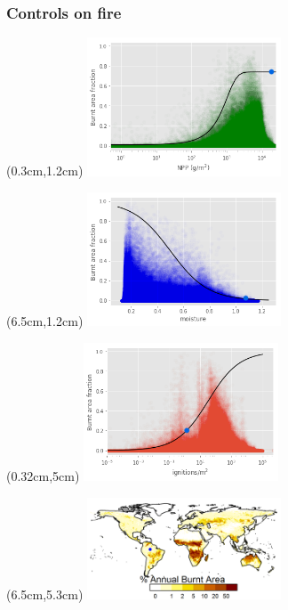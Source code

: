 \begin{frame}
	\frametitle{Controls on fire}
	\begin{textblock*}{14cm}(0.3cm,1.2cm)
		\includegraphics[width=5.78cm]{images/limitCurves/RainF/NPPVsFire}	
	\end{textblock*}
	\begin{textblock*}{14cm}(6.5cm,1.2cm)
		\includegraphics[width=5.78cm]{images/limitCurves/RainF/alphaVsFire}	
	\end{textblock*}
	\begin{textblock*}{14cm}(0.32cm,5cm)
		\includegraphics[width=5.78cm]{images/limitCurves/RainF/ignitionsVsFire.png}		
	\end{textblock*}
	\begin{textblock*}{14cm}(6.5cm,5.3cm)
		\includegraphics[width=5.78cm]{images/limitCurves/RainF/fireMap.png}		
	\end{textblock*}
\end{frame}


